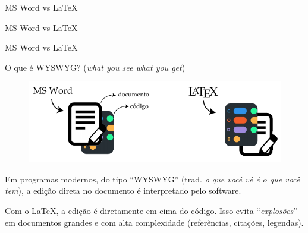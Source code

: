 \documentclass[aspectratio=169, 8pt]{beamer}
\begin{document}
	\begin{frame}{MS Word vs \LaTeX}
	\end{frame}
	\begin{frame}{MS Word vs \LaTeX}
	\end{frame}
	\begin{frame}{MS Word vs \LaTeX}
	\end{frame}

	\begin{frame}{O que é WYSWYG? (\emph{what you see what you get})}
		\begin{figure}
			\centering
			\includegraphics[width=\textwidth]{figures/WYSWYG.pdf}
		\end{figure}

		\pause

		Em programas modernos, do tipo ``WYSWYG'' (trad. \emph{o que você vê é o que você tem}), a edição direta no documento é interpretado pelo software.

		\vspace{1em}

		Com o \LaTeX, a edição é diretamente em cima do código. Isso evita ``\emph{explosões}'' em documentos grandes e com alta complexidade (referências, citações, legendas).

	\end{frame}
\end{document}
